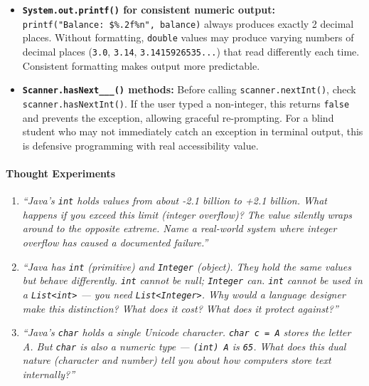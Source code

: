 \documentclass[
  justified,
  openright,
]{tufte-book}
\let\paragraph\paragraph
\let\paragraph\paragraph
\begin{document}
\begin{itemize}
\item
  \textbf{\texttt{System.out.printf()} for consistent numeric output:}
  \texttt{printf("Balance:\ \$\%.2f\%n",\ balance)} always produces
  exactly 2 decimal places. Without formatting, \texttt{double} values
  may produce varying numbers of decimal places (\texttt{3.0},
  \texttt{3.14}, \texttt{3.1415926535...}) that read differently each
  time. Consistent formatting makes output more predictable.
\item
  \textbf{\texttt{Scanner.hasNext\_\_\_()} methods:} Before calling
  \texttt{scanner.nextInt()}, check \texttt{scanner.hasNextInt()}. If
  the user typed a non-integer, this returns \texttt{false} and prevents
  the exception, allowing graceful re-prompting. For a blind student who
  may not immediately catch an exception in terminal output, this is
  defensive programming with real accessibility value.
\end{itemize}

\paragraph{Thought Experiments}\label{thought-experiments-2}

\begin{enumerate}
\def\labelenumi{\arabic{enumi}.}
\item
  \emph{``Java's \texttt{int} holds values from about -2.1 billion to
  +2.1 billion. What happens if you exceed this limit (integer
  overflow)? The value silently wraps around to the opposite extreme.
  Name a real-world system where integer overflow has caused a
  documented failure.''}
\item
  \emph{``Java has \texttt{int} (primitive) and \texttt{Integer}
  (object). They hold the same values but behave differently.
  \texttt{int} cannot be null; \texttt{Integer} can. \texttt{int} cannot
  be used in a \texttt{List\textless{}int\textgreater{}} --- you need
  \texttt{List\textless{}Integer\textgreater{}}. Why would a language
  designer make this distinction? What does it cost? What does it
  protect against?''}
\item
  \emph{``Java's \texttt{char} holds a single Unicode character.
  \texttt{char\ c\ =\ \textquotesingle{}A\textquotesingle{}} stores the
  letter A. But \texttt{char} is also a numeric type ---
  \texttt{(int)\ \textquotesingle{}A\textquotesingle{}} is \texttt{65}.
  What does this dual nature (character and number) tell you about how
  computers store text internally?''}
\end{enumerate}
\end{document}
